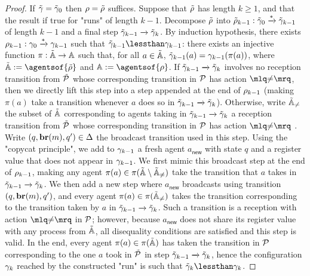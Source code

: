 \begin{proof}
	If $\tilde{\gamma} = \tilde{\gamma}_0$ then $\rho = \tilde{\rho}$ suffices. Suppose that $\tilde{\rho}$ has length $k \geq 1$, and that the result if true for "runs" of length $k-1$. Decompose $\tilde{\rho}$ into $\tilde{\rho}_{k-1}: \tilde{\gamma}_0 \xrightarrow{*} \tilde{\gamma}_{k-1}$ of length $k-1$ and a final step $\tilde{\gamma}_{k-1} \xrightarrow{} \tilde{\gamma}_k$. 
	By induction hypothesis, there exists $\rho_{k-1}: \gamma_0 \xrightarrow{*} \gamma_{k-1}$ such that $\tilde{\config}_{k-1} \lessthan \config_{k-1}$: there exists an injective function $\pi : \tilde{\mathbb{A}} \rightarrow \mathbb{A}$
	such that, for all $a \in \tilde{\mathbb{A}}$, $\tilde{\gamma}_{k-1}(a) = \gamma_{k-1}(\pi(a))$, where $\tilde{\agents} := \agentsof{\tilde{\run}}$ and $\agents := \agentsof{\run}$. If $\tilde{\gamma}_{k-1} \xrightarrow{} \tilde{\gamma}_k$ involves no reception transition from $\tilde{\mathcal{P}}$ whose corresponding transition in $\mathcal{P}$ has action $\quotemarks{\diseqtestact}$, then we directly lift this step into a step appended at the end of $\rho_{k-1}$ (making $\pi(a)$ take a transition whenever $a$ does so in $\tilde{\gamma}_{k-1} \xrightarrow{} \tilde{\gamma}_k$). 
	Otherwise, write $\tilde{\mathbb{A}}_{{\ne}}$ the subset of $\tilde{\mathbb{A}}$ corresponding to agents taking in $\tilde{\gamma}_{k-1} \xrightarrow{} \tilde{\gamma}_k$ a reception transition from $\tilde{\mathcal{P}}$ whose corresponding transition in $\mathcal{P}$ has action $\quotemarks{\diseqtestact}$ . 
	Write $(q, \textbf{br}(m), q') \in \Delta$ the broadcast transition used in this step.  Using the "copycat principle", we add to $\gamma_{k-1}$ a fresh agent $a_{\mathsf{new}}$ with state $q$ and a register value that does not appear in $\gamma_{k-1}$. 
	We first mimic this broadcast step at the end of $\rho_{k-1}$, making any agent $\pi(a) \in \pi(\tilde{\mathbb{A}} \setminus \tilde{\mathbb{A}}_{{\ne}})$ take the transition that $a$ takes in $\tilde{\gamma}_{k-1} \xrightarrow{} \tilde{\gamma}_k$. We then add a new step where $a_{\mathsf{new}}$ broadcasts using transition $(q, \textbf{br}(m), q')$, and every agent $\pi(a) \in \pi(\tilde{\mathbb{A}}_{{\ne}})$ takes the transition corresponding to the transition taken by $a$ in $\tilde{\gamma}_{k-1} \xrightarrow{} \tilde{\gamma}_k$. Such a transition is a reception with action $\quotemarks{\diseqtestact}$ in $\mathcal{P}$; however, because $a_{\mathsf{new}}$ does not share its register value with any process from $\tilde{\mathbb{A}}$, all disequality conditions are satisfied and this step is valid. In the end, every agent $\pi(a) \in \pi(\tilde{\mathbb{A}})$ has taken the transition in $\mathcal{P}$ corresponding to the one $a$ took in $\tilde{\mathcal{P}}$ in step $\tilde{\gamma}_{k-1} \xrightarrow{} \tilde{\gamma}_k$, hence the configuration $\gamma_k$ reached by the constructed "run" is such that $\tilde{\config}_k \lessthan \config_k$. 
\end{proof}

